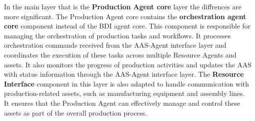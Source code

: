 In the main layer that is the \textbf{Production Agent core} layer the diffrences are more significant.
The Production Agent core contains the \textbf{orchestration agent core } component instead of the BDI agent core.
This component is responsible for managing the orchestration of production tasks and workflows.
It processes orchestration commands received from the AAS-Agent interface layer and coordinates the execution of these
tasks across multiple Resource Agents and assets.
It also monitors the progress of production activities and updates the AAS with status information through the AAS-Agent interface layer.
The \textbf{Resource Interface} component in this layer is also adapted
to handle communication with production-related assets, such as manufacturing equipment and assembly lines.
It ensures that the Production Agent can effectively manage and control these assets as part of the overall production process.

